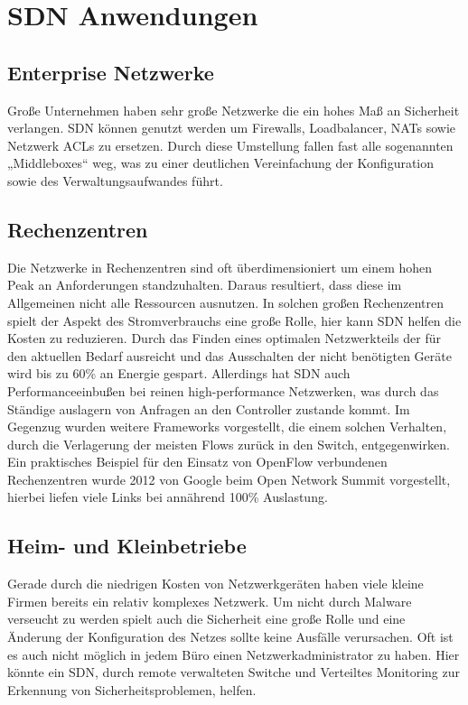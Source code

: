 \documentclass[twoside,12pt]{scrartcl}
\begin{document}
\section{SDN Anwendungen}
	\subsection{Enterprise Netzwerke}
	Große Unternehmen haben sehr große Netzwerke die ein hohes Maß an Sicherheit verlangen. SDN können genutzt werden um Firewalls, Loadbalancer, NATs sowie Netzwerk ACLs zu ersetzen. Durch diese Umstellung fallen fast alle sogenannten „Middleboxes“ weg, was zu einer deutlichen Vereinfachung der Konfiguration sowie des Verwaltungsaufwandes führt.
	\subsection{Rechenzentren}
	Die Netzwerke in Rechenzentren sind oft überdimensioniert um einem hohen Peak an Anforderungen standzuhalten. Daraus resultiert, dass diese im Allgemeinen nicht alle Ressourcen ausnutzen. In solchen großen Rechenzentren spielt der Aspekt des Stromverbrauchs eine große Rolle, hier kann SDN helfen die Kosten zu reduzieren. Durch das Finden eines optimalen Netzwerkteils der für den aktuellen Bedarf ausreicht und das Ausschalten der nicht benötigten Geräte wird bis zu 60\% an Energie gespart. Allerdings hat SDN auch Performanceeinbußen bei reinen high-performance Netzwerken, was durch das Ständige auslagern von Anfragen an den Controller zustande kommt. Im Gegenzug wurden weitere Frameworks vorgestellt, die einem solchen Verhalten, durch die Verlagerung der meisten Flows zurück in den Switch, entgegenwirken. Ein praktisches Beispiel für den Einsatz von OpenFlow verbundenen Rechenzentren wurde 2012 von Google beim Open Network Summit vorgestellt, hierbei liefen viele Links bei annährend 100\% Auslastung.
	\subsection{Heim- und Kleinbetriebe}
	Gerade durch die niedrigen Kosten von Netzwerkgeräten haben viele kleine Firmen bereits ein relativ komplexes Netzwerk. Um nicht durch Malware verseucht zu werden spielt auch die Sicherheit eine große Rolle und eine Änderung der Konfiguration des Netzes sollte keine Ausfälle verursachen. Oft ist es auch nicht möglich in jedem Büro einen Netzwerkadministrator zu haben. Hier könnte ein SDN, durch remote verwalteten Switche und Verteiltes Monitoring zur Erkennung von Sicherheitsproblemen, helfen.
\end{document}
